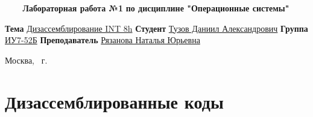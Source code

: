 \documentclass{article}
\begin{document}
\begin{titlepage}
	\noindent\begin{minipage}{1.0\textwidth}\centering
		\Large\textbf{   ~~~ Лабораторная работа №1}\newline
		\textbf{по дисциплине "Операционные системы"}\newline\newline\newline\newline\newline\newline\newline\newline
	\end{minipage}

	\noindent\textbf{Тема} \underline{Дизассемблирование INT 8h}\newline\newline
	\textbf{Студент} \underline{Тузов Даниил Александрович}\newline\newline
	\textbf{Группа} \underline{ИУ7-52Б}\newline\newline
	\textbf{Преподаватель} \underline{Рязанова Наталья Юрьевна}
	
	\begin{center}
		\vfill
		Москва, \the\year ~г.
	\end{center}
	\clearpage
\end{titlepage}

\section{Дизассемблированные коды}
\end{document}
